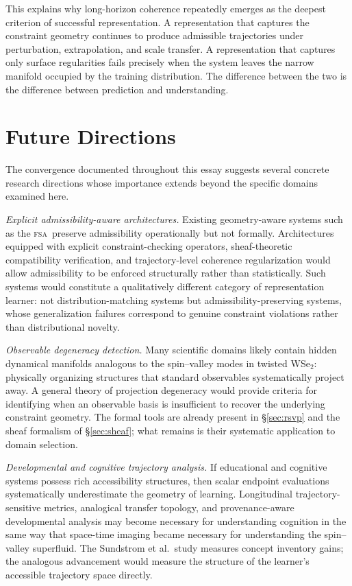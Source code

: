 \documentclass[11pt,a4paper]{article}
\theoremstyle{plain}
\theoremstyle{definition}
\theoremstyle{remark}
\newcommand{\FSA}{\textup{\textsc{fsa}}}
\begin{document}
This explains why long-horizon coherence repeatedly emerges as the deepest
criterion of successful representation. A representation that captures the
constraint geometry continues to produce admissible trajectories under
perturbation, extrapolation, and scale transfer. A representation that
captures only surface regularities fails precisely when the system leaves
the narrow manifold occupied by the training distribution. The difference
between the two is the difference between prediction and understanding.

\section{Future Directions}
\label{sec:future}

The convergence documented throughout this essay suggests several concrete
research directions whose importance extends beyond the specific domains
examined here.

\textit{Explicit admissibility-aware architectures.} Existing
geometry-aware systems such as the \FSA\ preserve admissibility
operationally but not formally. Architectures equipped with explicit
constraint-checking operators, sheaf-theoretic compatibility verification,
and trajectory-level coherence regularization would allow admissibility to
be enforced structurally rather than statistically. Such systems would
constitute a qualitatively different category of representation learner:
not distribution-matching systems but admissibility-preserving systems,
whose generalization failures correspond to genuine constraint violations
rather than distributional novelty.

\textit{Observable degeneracy detection.} Many scientific domains likely
contain hidden dynamical manifolds analogous to the spin--valley modes in
twisted WSe$_2$: physically organizing structures that standard observables
systematically project away. A general theory of projection degeneracy would
provide criteria for identifying when an observable basis is insufficient
to recover the underlying constraint geometry. The formal tools are already
present in \S\ref{sec:rsvp} and the sheaf formalism of \S\ref{sec:sheaf};
what remains is their systematic application to domain selection.

\textit{Developmental and cognitive trajectory analysis.} If educational and
cognitive systems possess rich accessibility structures, then scalar endpoint
evaluations systematically underestimate the geometry of learning.
Longitudinal trajectory-sensitive metrics, analogical transfer topology, and
provenance-aware developmental analysis may become necessary for understanding
cognition in the same way that space-time imaging became necessary for
understanding the spin--valley superfluid. The Sundstrom et al.\ study
measures concept inventory gains; the analogous advancement would measure
the structure of the learner's accessible trajectory space directly.
\end{document}
